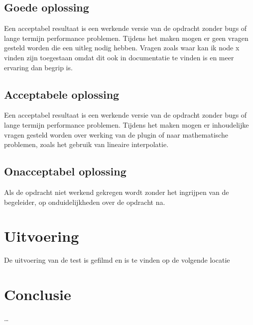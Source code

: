 \subsection{Goede oplossing}
Een acceptabel resultaat is een werkende versie van de opdracht zonder bugs of lange termijn performance problemen. Tijdens het maken mogen er geen vragen gesteld worden die een uitleg nodig hebben. Vragen zoals waar kan ik node x vinden zijn toegestaan omdat dit ook in documentatie te vinden is en meer ervaring dan begrip is. 

\subsection{Acceptabele oplossing}
Een acceptabel resultaat is een werkende versie van de opdracht zonder bugs of lange termijn performance problemen. Tijdens het maken mogen er inhoudelijke vragen gesteld worden over werking van de plugin of naar mathematische problemen, zoals het gebruik van lineaire interpolatie.

\subsection{Onacceptabel oplossing}
Als de opdracht niet werkend gekregen wordt zonder het ingrijpen van de begeleider, op onduidelijkheden over de opdracht na.  

\section{Uitvoering}
De uitvoering van de test is gefilmd en is te vinden op de volgende locatie 

\section{Conclusie}
\dots
